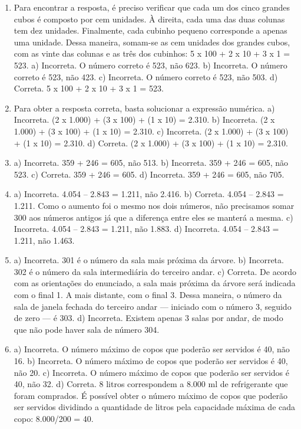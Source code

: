 
\begin{enumerate}
\item
Para encontrar a resposta, é preciso verificar que cada um dos 
cinco grandes cubos é composto por cem unidades. À direita, cada uma das 
duas colunas tem dez unidades. Finalmente, cada cubinho pequeno 
corresponde a apenas uma unidade. Dessa maneira, somam-se as cem unidades 
dos grandes cubos, com as vinte das colunas e as três dos cubinhos: 5 x 
100 + 2 x 10 + 3 x 1 = 523.  
a) Incorreta. O número correto é 523, não 623.
b) Incorreta. O número correto é 523, não 423.
c) Incorreta. O número correto é 523, não 503.
d) Correta. 5 x 100 + 2 x 10 + 3 x 1 = 523.

\item
Para obter a resposta correta, basta solucionar a expressão numérica.
a) Incorreta. (2 x 1.000) + (3 x 100) + (1 x 10) = 2.310.
b) Incorreta. (2 x 1.000) + (3 x 100) + (1 x 10) = 2.310.
c) Incorreta. (2 x 1.000) + (3 x 100) + (1 x 10) = 2.310.
d) Correta. (2 x 1.000) + (3 x 100) + (1 x 10) = 2.310.

\item
a) Incorreta. 359 + 246 = 605, não 513.
b) Incorreta. 359 + 246 = 605, não 523.
c) Correta. 359 + 246 = 605.
d) Incorreta. 359 + 246 = 605, não 705.

\item
a) Incorreta. 4.054 -- 2.843 = 1.211, não 2.416.
b) Correta. 4.054 -- 2.843 = 1.211. Como o aumento foi o mesmo
nos dois números, não precisamos somar 300 aos números
antigos já que a diferença entre eles se manterá a mesma.
c) Incorreta. 4.054 -- 2.843 = 1.211, não 1.883.
d) Incorreta. 4.054 -- 2.843 = 1.211, não 1.463.

\item
a) Incorreta. 301 é o número da sala mais próxima da árvore.
b) Incorreta. 302 é o número da sala intermediária do terceiro andar.
c) Correta. De acordo com as orientações do enunciado, a sala mais
próxima da árvore será indicada com o final 1. A mais distante, com o 
final 3. Dessa maneira, o número da sala de janela fechada do terceiro 
andar --- iniciado com o número 3, seguido de zero --- é 303.
d) Incorreta. Existem apenas 3 salas por andar, de modo que não pode
haver sala de número 304.

\item
a) Incorreta. O número máximo de copos que poderão ser servidos é 40, não
16.
b) Incorreta. O número máximo de copos que poderão ser servidos é 40, não 20.
c) Incorreta. O número máximo de copos que poderão ser servidos é 40, não 32.
d) Correta. 8 litros correspondem a 8.000 ml de refrigerante que foram
comprados. É possível obter o número máximo de copos que poderão ser
servidos dividindo a quantidade de litros pela capacidade máxima de 
cada copo: 8.000/200 = 40.


\end{enumerate}
